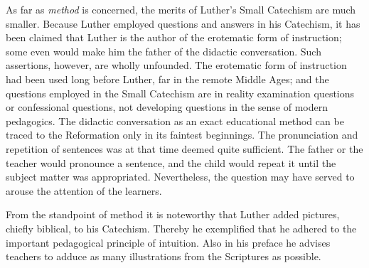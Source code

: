 As far as \emph{method} is concerned, the merits of Luther’s Small Catechism are much smaller. Because Luther employed questions and answers in his Catechism, it has been claimed that Luther is the author of the erotematic form of instruction; some even would make him the father of the didactic conversation. Such assertions, however, are wholly unfounded. The erotematic form of instruction had been used long before Luther, far in the remote Middle Ages; and the questions employed in the Small Catechism are in reality examination questions or confessional questions, not developing questions in the sense of modern pedagogics. The didactic conversation as an exact educational method can be traced to the Reformation only in its faintest beginnings. The pronunciation and repetition of sentences was at that time deemed quite sufficient. The father or the teacher would pronounce a sentence, and the child would repeat it until the subject matter was appropriated. Nevertheless, the question may have served to arouse the attention of the learners.

From the standpoint of method it is noteworthy that Luther added pictures, chiefly biblical, to his Catechism. Thereby he exemplified that he adhered to the important pedagogical principle of intuition. Also in his preface he advises teachers to adduce as many illustrations from the Scriptures as possible.

